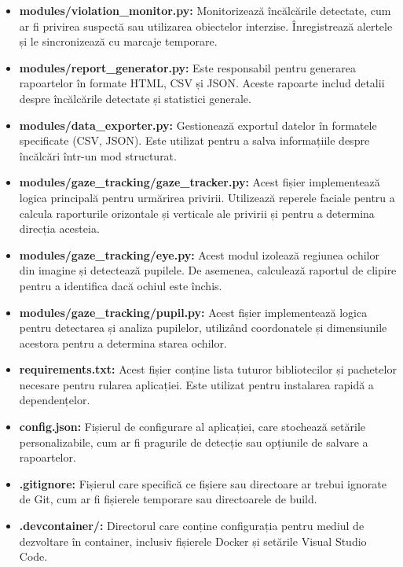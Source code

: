 \documentclass[12pt,a4paper]{article}
\begin{document}
\begin{itemize}
    \item \textbf{modules/violation\_monitor.py:} Monitorizează încălcările detectate, cum ar fi privirea suspectă sau utilizarea obiectelor interzise. Înregistrează alertele și le sincronizează cu marcaje temporare.

    \item \textbf{modules/report\_generator.py:} Este responsabil pentru generarea rapoartelor în formate HTML, CSV și JSON. Aceste rapoarte includ detalii despre încălcările detectate și statistici generale.

    \item \textbf{modules/data\_exporter.py:} Gestionează exportul datelor în formatele specificate (CSV, JSON). Este utilizat pentru a salva informațiile despre încălcări într-un mod structurat.
    
    \item \textbf{modules/gaze\_tracking/gaze\_tracker.py:} Acest fișier implementează logica principală pentru urmărirea privirii. Utilizează reperele faciale pentru a calcula raporturile orizontale și verticale ale privirii și pentru a determina direcția acesteia.

    \item \textbf{modules/gaze\_tracking/eye.py:} Acest modul izolează regiunea ochilor din imagine și detectează pupilele. De asemenea, calculează raportul de clipire pentru a identifica dacă ochiul este închis.

    \item \textbf{modules/gaze\_tracking/pupil.py:} Acest fișier implementează logica pentru detectarea și analiza pupilelor, utilizând coordonatele și dimensiunile acestora pentru a determina starea ochilor.

    \item \textbf{requirements.txt:} Acest fișier conține lista tuturor bibliotecilor și pachetelor necesare pentru rularea aplicației. Este utilizat pentru instalarea rapidă a dependențelor.

    \item \textbf{config.json:} Fișierul de configurare al aplicației, care stochează setările personalizabile, cum ar fi pragurile de detecție sau opțiunile de salvare a rapoartelor.

    \item \textbf{.gitignore:} Fișierul care specifică ce fișiere sau directoare ar trebui ignorate de Git, cum ar fi fișierele temporare sau directoarele de build.

    \item \textbf{.devcontainer/:} Directorul care conține configurația pentru mediul de dezvoltare în container, inclusiv fișierele Docker și setările Visual Studio Code.
\end{itemize}
\end{document}
